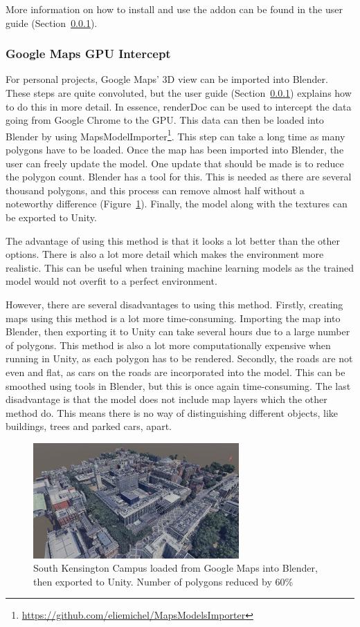 More information on how to install and use the addon can be found in the user guide (Section~\ref{}).

\subsubsection{Google Maps GPU Intercept}
For personal projects, Google Maps' 3D view can be imported into Blender. These steps are quite convoluted, but the user guide (Section~\ref{}) explains how to do this in more detail. In essence, renderDoc can be used to intercept the data going from Google Chrome to the GPU. This data can then be loaded into Blender by using MapsModelImporter\footnote{\url{https://github.com/eliemichel/MapsModelsImporter}}. This step can take a long time as many polygons have to be loaded. Once the map has been imported into Blender, the user can freely update the model. One update that should be made is to reduce the polygon count. Blender has a tool for this. This is needed as there are several thousand polygons, and this process can remove almost half without a noteworthy difference (Figure~\ref{maps:figure:GoogleMaps}). Finally, the model along with the textures can be exported to Unity. 

The advantage of using this method is that it looks a lot better than the other options. There is also a lot more detail which makes the environment more realistic. This can be useful when training machine learning models as the trained model would not overfit to a perfect environment. 

However, there are several disadvantages to using this method. Firstly, creating maps using this method is a lot more time-consuming. Importing the map into Blender, then exporting it to Unity can take several hours due to a large number of polygons. This method is also a lot more computationally expensive when running in Unity, as each polygon has to be rendered. Secondly, the roads are not even and flat, as cars on the roads are incorporated into the model. This can be smoothed using tools in Blender, but this is once again time-consuming. The last disadvantage is that the model does not include map layers which the other method do. This means there is no way of distinguishing different objects, like buildings, trees and parked cars, apart. 

\begin{figure}[H]
    \centering
    \includegraphics[width=0.7\textwidth]{06_Implementation/00_Maps/Images/Google5Cropped.JPG}
    \caption{South Kensington Campus loaded from Google Maps into Blender, then exported to Unity. Number of polygons reduced by 60\%}
    \label{maps:figure:GoogleMaps}
\end{figure}

